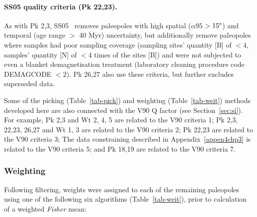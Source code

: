 \paragraph{SS05 quality criteria (Pk 22,23).}\label{subp:ss05} As with Pk 2,3,
SS05~\citep{S05} removes paleopoles with high spatial ($\alpha$95 $>15\degree$)
and temporal (age range $>$ 40 Myr) uncertainty, but additionally remove
paleopoles where samples had poor sampling coverage (sampling sites' quantity
[B] of $<4$, samples' quantity [N] of $<4$ times of the sites [B]) and were not
subjected to even a blanket demagnetisation treatment (laboratory cleaning
procedure code DEMAGCODE $<2$). Pk 26,27 also use these criteria, but
further excludes superseded data.

\bigskip
Some of the picking (Table~\ref{tab-pick}) and weighting (Table~\ref{tab-weit})
methods developed here are also connected with the V90 Q factor (see
Section~\ref{sec:si}). For example, Pk 2,3 and Wt 2, 4, 5 are related to the V90
criteria 1; Pk 2,3, 22,23, 26,27 and Wt 1, 3 are related to the V90 criteria 2;
Pk 22,23 are related to the V90 criteria 3; The data constraining described in
Appendix~\ref{appen4chp3} is related to the V90 criteria 5; and Pk 18,19 are
related to the V90 criteria 7.

\subsubsection{Weighting}\label{sec:w}

Following filtering, weights were assigned to each of the remaining paleopoles
using one of the following six algorithms (Table~\ref{tab-weit}), prior to
calculation of a weighted \emph{Fisher} mean:

